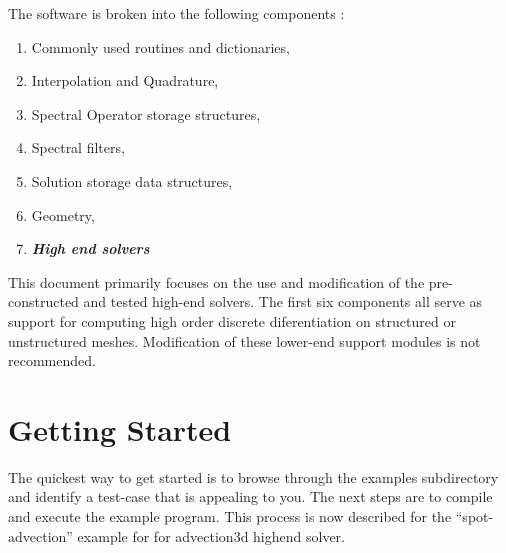 \documentclass[12pt]{softwaremanual}
\begin{document}
The software is broken into the following components :
\begin{enumerate}
\item Commonly used routines and dictionaries,
\item Interpolation and Quadrature,
\item Spectral Operator storage structures,
\item Spectral filters,
\item Solution storage data structures,
\item Geometry,
\item \textbf{\textit{High end solvers}}
\end{enumerate}

This document primarily focuses on the use and modification of the pre-constructed and tested high-end solvers. The first six components all serve as support for computing high order discrete diferentiation on structured or unstructured meshes. Modification of these lower-end support modules is not recommended. 

\chapter{Getting Started}
The quickest way to get started is to browse through the examples subdirectory and identify a test-case that is appealing to you. The next steps are to compile and execute the example program. This process is now described for the ``spot-advection'' example for for advection3d highend solver.
\end{document}
